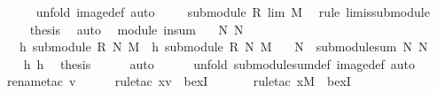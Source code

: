 \begin{isabellebody}
\ \ \ \ \isamarkupfalse%
\ {\isacharparenleft}unfold\ image{\isacharunderscore}def{\isacharcomma}\ auto{\isacharparenright}\isanewline
\ \ \isamarkupfalse%
\ {}{\isacharcolon}\ {\isachardoublequoteopen}submodule\ R\ {\isacharparenleft}l{\isachardot}im{\isacharparenright}\ M{\isachardoublequoteclose}\ \isamarkupfalse%
\ {\isacharparenleft}rule\ l{\isachardot}im{\isacharunderscore}is{\isacharunderscore}submodule{\isacharparenright}\isanewline
\ \ \isamarkupfalse%
\ {}\ {}\ \isamarkupfalse%
\ {\isacharquery}thesis\ \isamarkupfalse%
\ auto\isanewline
{}\isamarkupfalse%
%
\endisatagproof
{\isafoldproof}%
%
\isadelimproof
\isanewline
%
\endisadelimproof
\isanewline
{}\isamarkupfalse%
\ {\isacharparenleft}\ module{\isacharparenright}\ in{\isacharunderscore}sum{\isacharcolon}\isanewline
\ \ \ N{}\ N{}\isanewline
\ \ \ h{}{\isacharcolon}\ {\isachardoublequoteopen}submodule\ R\ N{}\ M{\isachardoublequoteclose}\ \ h{}{\isacharcolon}\ {\isachardoublequoteopen}submodule\ R\ N{}\ M{\isachardoublequoteclose}\isanewline
\ \ \ {\isachardoublequoteopen}N{}\ {\isasymsubseteq}\ submodule{\isacharunderscore}sum\ N{}\ N{}{\isachardoublequoteclose}\isanewline
%
\isadelimproof
%
\endisadelimproof
%
\isatagproof
{}\isamarkupfalse%
\ {\isacharminus}\isanewline
\ \ \isamarkupfalse%
\ h{}\ h{}\ \isamarkupfalse%
\ {\isacharquery}thesis\isanewline
\ \ \ \ \isamarkupfalse%
\ auto\isanewline
\ \ \ \ \isamarkupfalse%
\ {\isacharparenleft}unfold\ submodule{\isacharunderscore}sum{\isacharunderscore}def\ image{\isacharunderscore}def{\isacharcomma}\ auto{\isacharparenright}\isanewline
\ \ \ \ \isamarkupfalse%
\ {\isacharparenleft}rename{\isacharunderscore}tac\ v{\isacharparenright}\isanewline
\ \ \ \ \isamarkupfalse%
\ {\isacharparenleft}rule{\isacharunderscore}tac\ x{\isacharequal}{\isachardoublequoteopen}v{\isachardoublequoteclose}\ \ bexI{\isacharparenright}\isanewline
\ \ \ \ \ \isamarkupfalse%
\ {\isacharparenleft}rule{\isacharunderscore}tac\ x{\isacharequal}{\isachardoublequoteopen}{\isasymzero}\isactrlbsub M\isactrlesub {\isachardoublequoteclose}\ \ bexI{\isacharparenright}\isanewline

\end{isabellebody}
